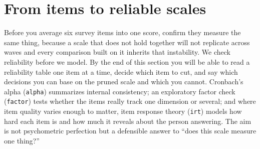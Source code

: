 \documentclass[
    a4paper,
    fontsize=10pt,
    twoside=true,
    numbers=noenddot,
]{kaobook}
\begin{document}
\section{From items to reliable scales}
Before you average six survey items into one score, confirm they measure the same thing, because a scale that does not hold together will not replicate across waves and every comparison built on it inherits that instability. We check reliability before we model. By the end of this section you will be able to read a reliability table one item at a time, decide which item to cut, and say which decisions you can base on the pruned scale and which you cannot. Cronbach's alpha (\texttt{alpha}) summarizes internal consistency; an exploratory factor check (\texttt{factor}) tests whether the items really track one dimension or several; and where item quality varies enough to matter, item response theory (\texttt{irt}) models how hard each item is and how much it reveals about the person answering. The aim is not psychometric perfection but a defensible answer to \enquote{does this scale measure one thing?}
\end{document}
